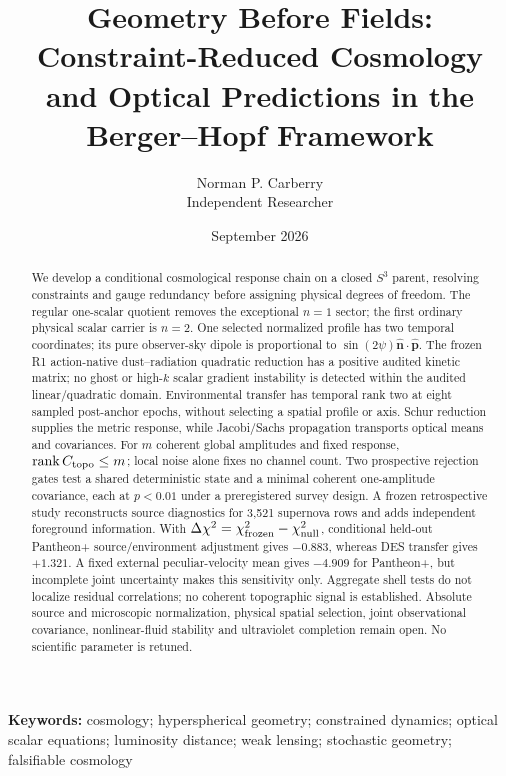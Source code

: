 \documentclass[11pt]{article}
\title{Geometry Before Fields: Constraint-Reduced Cosmology and Optical Predictions in the Berger--Hopf Framework}
\author{Norman P. Carberry\\Independent Researcher}
\date{September 2026}
\begin{document}
\maketitle

\begin{abstract}
We develop a conditional cosmological response chain on a closed $S^3$
parent, resolving constraints and gauge redundancy before assigning physical
degrees of freedom. The regular one-scalar quotient removes the exceptional
$n=1$ sector; the first ordinary physical scalar carrier is $n=2$.
One selected normalized profile has two temporal coordinates; its pure
observer-sky dipole is proportional to $\sin(2\psi)\hat{\mathbf n}\cdot\hat{\mathbf p}$.
The frozen R1 action-native dust--radiation quadratic reduction has a positive
audited kinetic matrix; no ghost or high-$k$ scalar gradient instability is
detected within the audited linear/quadratic domain. Environmental transfer
has temporal rank two at eight sampled post-anchor epochs, without selecting
a spatial profile or axis. Schur reduction supplies the metric response,
while Jacobi/Sachs propagation transports optical means and covariances.
For $m$ coherent global amplitudes and fixed response,
$\operatorname{rank}C_{\rm topo}\le m$; local noise alone fixes no channel count.
Two prospective rejection gates test a shared deterministic state and a
minimal coherent one-amplitude covariance, each at $p<0.01$ under a
preregistered survey design. A frozen retrospective study reconstructs source
diagnostics for 3,521 supernova rows and adds independent foreground information.
With $\Delta\chi^2=\chi^2_{\rm frozen}-\chi^2_{\rm null}$, conditional held-out
Pantheon+ source/environment adjustment gives $-0.883$, whereas DES transfer
gives $+1.321$. A fixed external peculiar-velocity mean gives $-4.909$ for
Pantheon+, but incomplete joint uncertainty makes this sensitivity only.
Aggregate shell tests do not localize residual correlations; no coherent
topographic signal is established. Absolute source and microscopic
normalization, physical spatial selection, joint observational covariance,
nonlinear-fluid stability and ultraviolet completion remain open.
No scientific parameter is retuned.
\end{abstract}
\noindent\textbf{Keywords:} cosmology; hyperspherical geometry; constrained dynamics; optical scalar equations; luminosity distance; weak lensing; stochastic geometry; falsifiable cosmology
\end{document}
